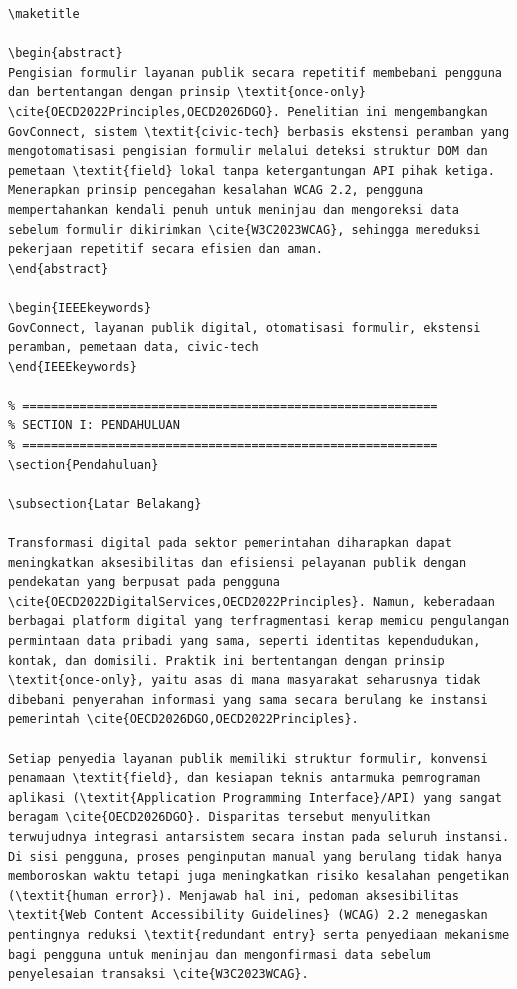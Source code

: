 \documentclass[conference]{IEEEtran}
\begin{document}
\begin{lstlisting}
\maketitle

\begin{abstract}
Pengisian formulir layanan publik secara repetitif membebani pengguna dan bertentangan dengan prinsip \textit{once-only} \cite{OECD2022Principles,OECD2026DGO}. Penelitian ini mengembangkan GovConnect, sistem \textit{civic-tech} berbasis ekstensi peramban yang mengotomatisasi pengisian formulir melalui deteksi struktur DOM dan pemetaan \textit{field} lokal tanpa ketergantungan API pihak ketiga. Menerapkan prinsip pencegahan kesalahan WCAG 2.2, pengguna mempertahankan kendali penuh untuk meninjau dan mengoreksi data sebelum formulir dikirimkan \cite{W3C2023WCAG}, sehingga mereduksi pekerjaan repetitif secara efisien dan aman.
\end{abstract}

\begin{IEEEkeywords}
GovConnect, layanan publik digital, otomatisasi formulir, ekstensi peramban, pemetaan data, civic-tech
\end{IEEEkeywords}

% ==========================================================
% SECTION I: PENDAHULUAN
% ==========================================================
\section{Pendahuluan}

\subsection{Latar Belakang}

Transformasi digital pada sektor pemerintahan diharapkan dapat meningkatkan aksesibilitas dan efisiensi pelayanan publik dengan pendekatan yang berpusat pada pengguna \cite{OECD2022DigitalServices,OECD2022Principles}. Namun, keberadaan berbagai platform digital yang terfragmentasi kerap memicu pengulangan permintaan data pribadi yang sama, seperti identitas kependudukan, kontak, dan domisili. Praktik ini bertentangan dengan prinsip \textit{once-only}, yaitu asas di mana masyarakat seharusnya tidak dibebani penyerahan informasi yang sama secara berulang ke instansi pemerintah \cite{OECD2026DGO,OECD2022Principles}.

Setiap penyedia layanan publik memiliki struktur formulir, konvensi penamaan \textit{field}, dan kesiapan teknis antarmuka pemrograman aplikasi (\textit{Application Programming Interface}/API) yang sangat beragam \cite{OECD2026DGO}. Disparitas tersebut menyulitkan terwujudnya integrasi antarsistem secara instan pada seluruh instansi. Di sisi pengguna, proses penginputan manual yang berulang tidak hanya memboroskan waktu tetapi juga meningkatkan risiko kesalahan pengetikan (\textit{human error}). Menjawab hal ini, pedoman aksesibilitas \textit{Web Content Accessibility Guidelines} (WCAG) 2.2 menegaskan pentingnya reduksi \textit{redundant entry} serta penyediaan mekanisme bagi pengguna untuk meninjau dan mengonfirmasi data sebelum penyelesaian transaksi \cite{W3C2023WCAG}.


\end{lstlisting}
\end{document}
